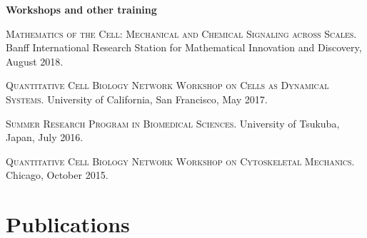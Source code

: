\documentclass[letterpaper,10pt]{article} %
\begin{document}
%
%


%
%

\textbf{Workshops and other training}

\begin{description}
\item \textsc{Mathematics of the Cell: Mechanical and Chemical Signaling across Scales.} Banff International Research Station for Mathematical Innovation and Discovery, August 2018.
\item \textsc{Quantitative Cell Biology Network Workshop on Cells as Dynamical Systems.} University of California, San Francisco, May 2017.
\item \textsc{Summer Research Program in Biomedical Sciences.} University of Tsukuba, Japan, July 2016.
\item \textsc{Quantitative Cell Biology Network Workshop on Cytoskeletal Mechanics.} Chicago, October 2015.
\end{description}


\section{Publications}
\end{document}
